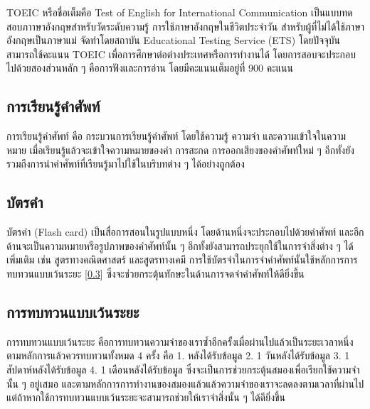 \documentclass[12pt,oneside,openright,a4paper]{cpe-thai-project}
\begin{document}
\hspace{1cm}
TOEIC \cite{TOEIC} หรือชื่อเต็มคือ Test of English for International Communication เป็นแบบทดสอบภาาษาอังกฤษสำหรับวัดระดับความรู้
การใช้ภาษาอังกฤษในชีวิตประจำวัน สำหรับผู้ที่ไม่ได้ใช้ภาษาอังกฤษเป็นภาษาแม่ จัดทำโดยสถาบัน Educational Testing Service (ETS) โดยปัจจุบัน
สามารถใช้คะแนน TOEIC เพื่อการศึกษาต่อต่างประเทศหรือการทำงานได้ โดยการสอบจะประกอบไปด้วยสองส่วนหลัก ๆ คือการฟังและการอ่าน
โดยมีคะแนนเต็มอยู่ที่ 900 คะแนน

\subsection{การเรียนรู้คำศัพท์}

\hspace{1cm}
การเรียนรู้คำศัพท์ \cite{LearnEng} คือ กระบวนการเรียนรู้คำศัพท์ โดยใช้ความรู้ ความจำ และความเข้าใจในความหมาย เมื่อเรียนรู้แล้วจะเข้าใจความหมายของคำ
การสะกด การออกเสียงของคำศัพท์ใหม่ ๆ อีกทั้งยังรวมถึงการนำคำศัพท์ที่เรียนรู้มาไปใช้ในบริบทต่าง ๆ ได้อย่างถูกต้อง

\subsection{บัตรคำ}

\hspace{1cm}
บัตรคำ (Flash card) \cite{Flashcard} เป็นสื่อการสอนในรูปแบบหนึ่ง โดยด้านหนึ่งจะประกอบไปด้วยคำศัพท์
และอีกด้านจะเป็นความหมายหรือรูปภาพของคำศัพท์นั้น ๆ อีกทั้งยังสามารถประยุกใช้ในการจำสิ่งต่าง ๆ ได้เพิ่มเติม เช่น
สูตรทางคณิตศาสตร์ และสูตรทางเคมี การใช้บัตรจำในการจำคำศัพท์นั้นใช้หลักการการทบทวนแบบเว้นระยะ [\ref{ssec:SpacedRepetition}]
ซึ่งจะช่วยกระตุ้นทักษะในด้านการจดจำคำศัพท์ให้ดียิ่งขึ้น

\subsection{การทบทวนแบบเว้นระยะ}\label{ssec:SpacedRepetition}

\hspace{1cm}
การทบทวนแบบเว้นระยะ \cite{SpacedRepetition} คือการทบทวนความจำของเราซ้ำอีกครั้งเมื่อผ่านไปแล้วเป็นระยะเวลาหนึ่ง ตามหลักการแล้วควรทบทวนทั้งหมด 4 ครั้ง คือ
1. หลังได้รับข้อมูล 2. 1 วันหลังได้รับข้อมูล 3. 1 สัปดาห์หลังได้รับข้อมูล 4. 1 เดือนหลังได้รับข้อมูล
ซึ่งจะเป็นการช่วยกระตุ้นสมองเพื่อเรียกใช้ความจำนั้น ๆ อยู่เสมอ และตามหลักการการทำงานของสมองแล้วแล้วความจำของเราจะลดลงตามเวลาที่ผ่านไป
แต่ถ้าหากใช้การทบทวนแบบเว้นระยะจะสามารถช่วยให้เราจำสิ่งนั้น ๆ ได้ดียิ่งขึ้น
\end{document}
